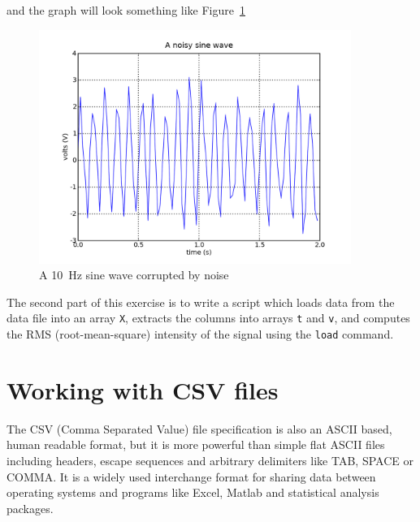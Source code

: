 

and the graph will look something like Figure~\ref{fig:noisy_sine}

\begin{center}%
\begin{figure}
\begin{centering}\includegraphics[width=4in]{fig/noisy_sine}\par\end{centering}


\caption{\label{fig:noisy_sine}A 10~Hz sine wave corrupted by noise}
\end{figure}
\par\end{center}


The second part of this exercise is to write a script which loads data
from the data file into an array \texttt{X}, extracts the columns into
arrays \texttt{t} and \texttt{v}, and computes the RMS
(root-mean-square) intensity of the signal using the \texttt{load}
command.

\section{Working with CSV files}

The CSV (Comma Separated Value) file specification is also an ASCII
based, human readable format, but it is more powerful than simple flat
ASCII files including headers, escape sequences and arbitrary
delimiters like TAB, SPACE or COMMA.  It is a widely used interchange
format for sharing data between operating systems and programs like
Excel, Matlab and statistical analysis packages.

